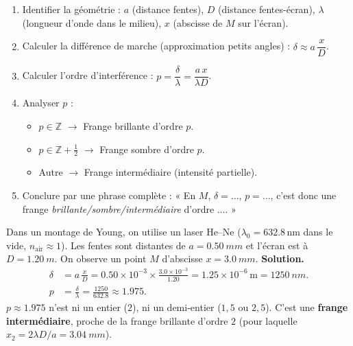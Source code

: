 \documentclass[11pt]{article}
\begin{document}
\begin{methode}
\begin{enumerate}
  \item Identifier la géométrie : $a$ (distance fentes), $D$ (distance fentes-écran), $\lambda$ (longueur d'onde dans le milieu), $x$ (abscisse de $M$ sur l'écran).
  \item Calculer la différence de marche (approximation petits angles) : $\delta \approx a\,\dfrac{x}{D}$.
  \item Calculer l'ordre d'interférence : $p = \dfrac{\delta}{\lambda} = \dfrac{a\,x}{\lambda D}$.
  \item Analyser $p$ :
  \begin{itemize}
    \item $p \in \mathbb{Z}$ $\rightarrow$ Frange brillante d'ordre $p$.
    \item $p \in \mathbb{Z} + \frac12$ $\rightarrow$ Frange sombre d'ordre $p$.
    \item Autre $\rightarrow$ Frange intermédiaire (intensité partielle).
  \end{itemize}
  \item Conclure par une phrase complète : « En $M$, $\delta = \dots$, $p = \dots$, c'est donc une frange \emph{brillante/sombre/intermédiaire} d'ordre $\dots$. »
\end{enumerate}
\end{methode}

\begin{exemplebox}
Dans un montage de Young, on utilise un laser He–Ne ($\lambda_0 = \num{632,8}\,\text{nm}$ dans le vide, $n_{\text{air}} \approx 1$). Les fentes sont distantes de $a = \SI{0,50}{mm}$ et l'écran est à $D = \SI{1,20}{m}$. On observe un point $M$ d'abscisse $x = \SI{3,0}{mm}$.
\medskip
\textbf{Solution.}
\begin{align*}
\delta &= a\,\frac{x}{D} = 0.50 \times 10^{-3} \times \frac{3.0 \times 10^{-3}}{1.20} = 1.25 \times 10^{-6}\,\text{m} = \SI{1250}{nm}. \\
p &= \frac{\delta}{\lambda} = \frac{1250}{632.8} \approx 1.975.
\end{align*}
$p \approx \num{1,975}$ n'est ni un entier ($2$), ni un demi-entier ($1,5$ ou $2,5$). C'est une \textbf{frange intermédiaire}, proche de la frange brillante d'ordre $2$ (pour laquelle $x_2 = 2\lambda D/a = \SI{3,04}{mm}$).
\end{exemplebox}
\end{document}
